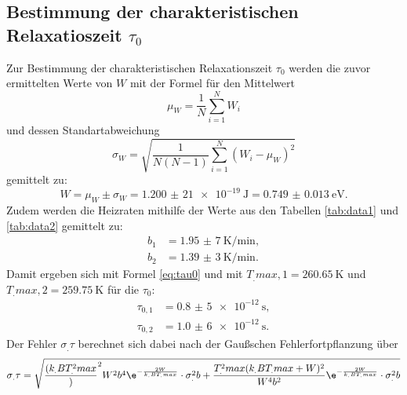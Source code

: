 \subsection{Bestimmung der charakteristischen Relaxatioszeit $\tau_0$}

Zur Bestimmung der charakteristischen Relaxationszeit $\tau_0$ werden die zuvor ermittelten Werte von $W$ mit der Formel für den Mittelwert
\[
\mu_W = \frac{1}{N}\sum_{i=1}^{N}W_i
\]
und dessen Standartabweichung
\[
\sigma_W = \sqrt{\frac{1}{N(N-1)}\sum_{i=1}^{N}(W_i-\mu_W)^2}
\]
gemittelt zu:
\[
W = \mu_W \pm \sigma_W = \SI{1,200(21)e-19}{\joule} = \SI{0.749(13)}{\electronvolt}\text{.}
\]
Zudem werden die Heizraten mithilfe der Werte aus den Tabellen \ref{tab:data1} und \ref{tab:data2} gemittelt zu:
\begin{align*}
b_1 &= \SI{1,95(7)}{\kelvin\per\minute},\\
b_2 &= \SI{1,39(3)}{\kelvin\per\minute}\text{.} 
\end{align*}
Damit ergeben sich mit Formel \eqref{eq:tau0} und mit $T_.{max,1}=\SI{260,65}{\kelvin}$ und $T_.{max,2}=\SI{259,75}{\kelvin}$ für die $\tau_0$:
\begin{align*}
\tau_{0,1} &= \SI{0,8(5)e-12}{\second},\\
\tau_{0,2} &= \SI{1,0(6)e-12}{\second}\text{.}
\end{align*}
Der Fehler $\sigma_.{\tau}$ berechnet sich dabei nach der Gaußschen Fehlerfortpflanzung über
\[
\sigma_.{\tau}=\sqrt{\frac{(k_.BT^2_.{max}})^2{W^2b^4}\e^{-\frac{2 W}{k_.BT_.{max}}}\cdot\sigma^2_.b+\frac{T^2_.{max}(k_.BT_.{max}+W)^2}{W^4b^2}\e^{-\frac{2 W}{k_.BT_.{max}}}\cdot\sigma^2_.b}
\]


